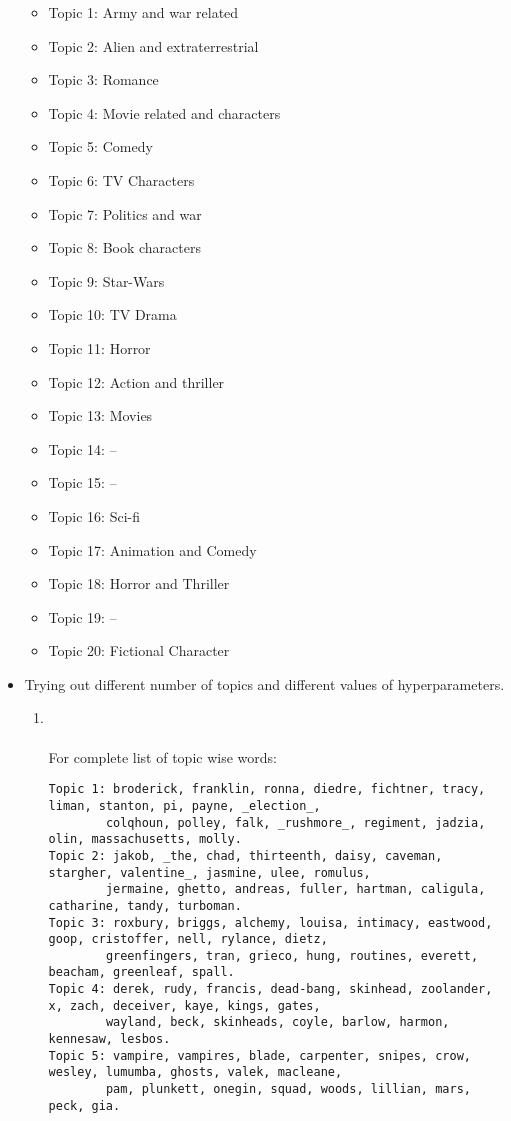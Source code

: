 \documentclass{article}[a4paper]
\begin{document}
\begin{itemize}
    \begin{itemize}
\item Topic 1: Army and war related
\item Topic 2: Alien and extraterrestrial
\item Topic 3: Romance
\item Topic 4: Movie related and characters
\item Topic 5: Comedy
\item Topic 6: TV Characters
\item Topic 7: Politics and war
\item Topic 8: Book characters
\item Topic 9: Star-Wars
\item Topic 10: TV Drama
\item Topic 11: Horror
\item Topic 12: Action and thriller
\item Topic 13: Movies
\item Topic 14: --
\item Topic 15: --
\item Topic 16: Sci-fi
\item Topic 17: Animation and Comedy
\item Topic 18:  Horror and Thriller
\item Topic 19: --
\item Topic 20: Fictional Character

    \end{itemize}
    
    
    \item Trying out different number of topics and different values of hyperparameters.
    \begin{enumerate}
        \item {}\\
         \\
        For complete list of topic wise words: 
\begin{Verbatim}[fontsize=\footnotesize]
Topic 1: broderick, franklin, ronna, diedre, fichtner, tracy, liman, stanton, pi, payne, _election_, 
        colqhoun, polley, falk, _rushmore_, regiment, jadzia, olin, massachusetts, molly.
Topic 2: jakob, _the, chad, thirteenth, daisy, caveman, stargher, valentine_, jasmine, ulee, romulus, 
        jermaine, ghetto, andreas, fuller, hartman, caligula, catharine, tandy, turboman.
Topic 3: roxbury, briggs, alchemy, louisa, intimacy, eastwood, goop, cristoffer, nell, rylance, dietz, 
        greenfingers, tran, grieco, hung, routines, everett, beacham, greenleaf, spall.
Topic 4: derek, rudy, francis, dead-bang, skinhead, zoolander, x, zach, deceiver, kaye, kings, gates, 
        wayland, beck, skinheads, coyle, barlow, harmon, kennesaw, lesbos.
Topic 5: vampire, vampires, blade, carpenter, snipes, crow, wesley, lumumba, ghosts, valek, macleane, 
        pam, plunkett, onegin, squad, woods, lillian, mars, peck, gia.
\end{Verbatim}
        

\end{enumerate}
\end{itemize}
\end{document}

